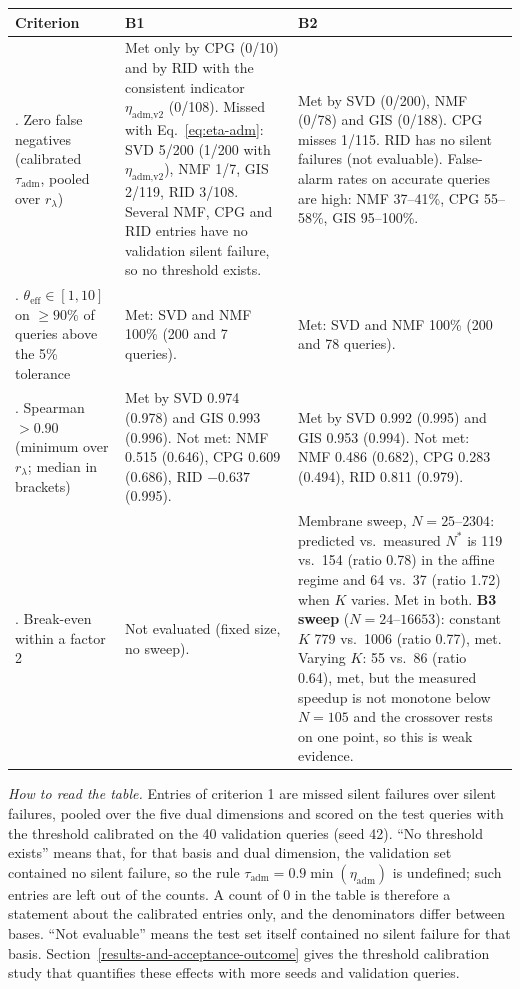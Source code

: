 \documentclass[11pt,a4paper]{article}
\begin{document}
\begin{longtable}{@{}>{\raggedright\arraybackslash}p{}>{\raggedright\arraybackslash}p{}>{\raggedright\arraybackslash}p{}@{}}
\toprule
Criterion & B1 & B2 \\
\midrule
\endhead
1. Zero false negatives (calibrated \(\tau_{\text{adm}}\), pooled over \(r_\lambda\)) & Met only by CPG (0/10) and by RID with the consistent indicator \(\eta_{\text{adm,v2}}\) (0/108). Missed with Eq.~\eqref{eq:eta-adm}: SVD 5/200 (1/200 with \(\eta_{\text{adm,v2}}\)), NMF 1/7, GIS 2/119, RID 3/108. Several NMF, CPG and RID entries have no validation silent failure, so no threshold exists. & Met by SVD (0/200), NMF (0/78) and GIS (0/188). CPG misses 1/115. RID has no silent failures (not evaluable). False-alarm rates on accurate queries are high: NMF 37--41\%, CPG 55--58\%, GIS 95--100\%. \\
2. \(\theta_{\text{eff}} \in [1,10]\) on \(\ge 90\%\) of queries above the 5\% tolerance & Met: SVD and NMF 100\% (200 and 7 queries). & Met: SVD and NMF 100\% (200 and 78 queries). \\
3. Spearman \(> 0.90\) (minimum over \(r_\lambda\); median in brackets) & Met by SVD 0.974 (0.978) and GIS 0.993 (0.996). Not met: NMF 0.515 (0.646), CPG 0.609 (0.686), RID \(-0.637\) (0.995). & Met by SVD 0.992 (0.995) and GIS 0.953 (0.994). Not met: NMF 0.486 (0.682), CPG 0.283 (0.494), RID 0.811 (0.979). \\
4. Break-even within a factor 2 & Not evaluated (fixed size, no sweep). & Membrane sweep, \(N = 25\)--\(2304\): predicted vs.\ measured \(N^*\) is 119 vs.\ 154 (ratio 0.78) in the affine regime and 64 vs.\ 37 (ratio 1.72) when \(K\) varies. Met in both. \textbf{B3 sweep} (\(N = 24\)--\(16653\)): constant \(K\) 779 vs.\ 1006 (ratio 0.77), met. Varying \(K\): 55 vs.\ 86 (ratio 0.64), met, but the measured speedup is not monotone below \(N = 105\) and the crossover rests on one point, so this is weak evidence. \\
\bottomrule
\end{longtable}

\emph{How to read the table.} Entries of criterion 1 are missed silent failures over silent failures, pooled over the five dual dimensions and scored on the test queries with the threshold calibrated on the 40 validation queries (seed 42). ``No threshold exists'' means that, for that basis and dual dimension, the validation set contained no silent failure, so the rule $\tau_{\mathrm{adm}} = 0.9\min(\eta_{\mathrm{adm}})$ is undefined; such entries are left out of the counts. A count of 0 in the table is therefore a statement about the calibrated entries only, and the denominators differ between bases. ``Not evaluable'' means the test set itself contained no silent failure for that basis. Section~\ref{results-and-acceptance-outcome} gives the threshold calibration study that quantifies these effects with more seeds and validation queries.
\end{document}

